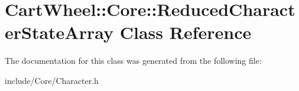\hypertarget{classCartWheel_1_1Core_1_1ReducedCharacterStateArray}{
\section{CartWheel::Core::ReducedCharacterStateArray Class Reference}
\label{classCartWheel_1_1Core_1_1ReducedCharacterStateArray}
}


The documentation for this class was generated from the following file:\begin{DoxyCompactItemize}
\item 
include/Core/Character.h\end{DoxyCompactItemize}
